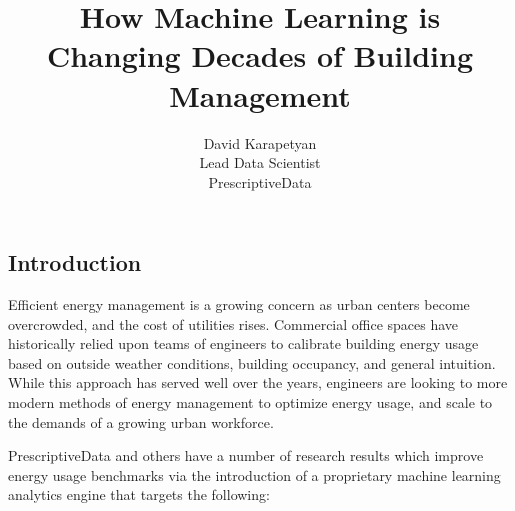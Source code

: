 \documentclass[12pt]{article}
\begin{document}
\author{David Karapetyan \\ Lead Data Scientist \\ PrescriptiveData}
\date{}
\title{How Machine Learning is Changing Decades of Building Management}
\maketitle

\subsection*{Introduction}
Efficient energy management is a growing concern as urban centers
become overcrowded, and the cost of utilities rises. Commercial office spaces
have historically relied upon teams of engineers to calibrate building energy
usage based on outside weather conditions, building occupancy, and general
intuition. While this approach has served well over the years, engineers are
looking to more modern methods of energy management to optimize energy usage,
and scale to the demands of a growing urban workforce.

PrescriptiveData and others have a number of research results which improve energy usage benchmarks via the introduction of a proprietary machine learning analytics engine that targets the
following: 
\end{document}
